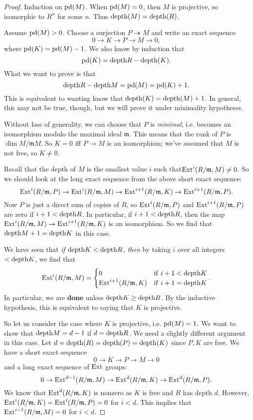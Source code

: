 \begin{proof} 
Induction on $\mathrm{pd}(M)$. When $\mathrm{pd}(M)=0$, then $M$ is projective,
so isomorphic
to $R^n$ for some $n$. Thus $\mathrm{depth}(M) = \mathrm{depth}(R)$. 

Assume $\mathrm{pd}(M) > 0$.
Choose a surjection $P \twoheadrightarrow M$ and write an exact
sequence
\[ 0 \to K \to P \to M \to 0,  \]
where $\mathrm{pd}(K) = \mathrm{pd}(M)-1$. We also know by induction that
\[ \mathrm{pd}(K) = \mathrm{depth} R - \mathrm{depth}(K).  \]
What we want to prove is that 
\[ \mathrm{depth} R - \mathrm{depth} M = \mathrm{pd}(M) = \mathrm{pd}(K)+1.  \]
This is equivalent to wanting know that $\mathrm{depth}(K) = \mathrm{depth} (M)
+1$.
In general, this may not be true, though, but we will prove it
under
minimality hypotheses.

Without loss of generality, we can choose that $P$ is
\emph{minimal}, i.e.
becomes an isomorphism modulo the maximal ideal $\mathfrak{m}$.
This means
that the rank of $P$ is $\dim M/\mathfrak{m}M$.
So $K = 0$ iff $P \to M$ is an isomorphism; we've assumed that
$M$ is not
free, so $K \neq 0$.

Recall that the depth of $M$ is the smallest value $i$ such that$\mathrm{Ext}^i(R/\mathfrak{m}, M) \neq 0$. So we should look at the
long exact
sequence from the above short exact sequence:
\[ \mathrm{Ext}^i(R/\mathfrak{m}, P) \to  \mathrm{Ext}^i(R/\mathfrak{m},M)  \to
\mathrm{Ext}^{i+1}(R/\mathfrak{m}, K) \to \mathrm{Ext}^{i+1}(R/\mathfrak{m},
P).\]
Now $P$ is just a direct sum of copies of $R$, so
$\mathrm{Ext}^i(R/\mathfrak{m}, P)$
and $\mathrm{Ext}^{i+1}(R/\mathfrak{m}, P)$ are zero if $i+1< \mathrm{depth} R$.
In
particular, if $i+1< \mathrm{depth} R$, then the map $
\mathrm{Ext}^i(R/\mathfrak{m},M) \to
\mathrm{Ext}^{i+1}(R/\mathfrak{m}, K) $ is an isomorphism.
So we find that $\mathrm{depth} M + 1 = \mathrm{depth} K$ in this case.

We have seen that \emph{if $\mathrm{depth} K < \mathrm{depth} R$, then } by
taking $i$ over
all integers $< \mathrm{depth} K$, we find that
\[ \mathrm{Ext}^{i}(R/\mathfrak{m}, M) = \begin{cases} 
0 & \mathrm{if \ } i+1 < \mathrm{depth} K \\
\mathrm{Ext}^{i+1}(R/\mathfrak{m},K) & \mathrm{if \ } i+1 = \mathrm{depth} K
\end{cases}. \]
In particular, we are \textbf{done} unless $\mathrm{depth} K \geq \mathrm{depth}
R$.
By the inductive hypothesis, this is equivalent to saying that
$K$ is
projective. 

So let us consider the case where $K$ is projective, i.e.
$\mathrm{pd}(M)=1$.
We want to show that $\mathrm{depth} M = d-1$ if $d = \mathrm{depth} R$.
We need a
slightly different argument in this case. Let $d = \mathrm{depth}(R) =
\mathrm{depth} (P) =
\mathrm{depth}(K)$ since $P,K$ are free. We have a short exact sequence
\[ 0 \to K \to P \to M \to 0  \]
and a long exact sequence of $\mathrm{Ext}$ groups:
\[ 0 \to \mathrm{Ext}^{d-1}(R/\mathfrak{m}, M) \to
\mathrm{Ext}^d(R/\mathfrak{m}, K) \to \mathrm{Ext}^d(R/\mathfrak{m}, P) .\]
We know that $\mathrm{Ext}^d(R/\mathfrak{m}, K)$ is nonzero as $K$ is
free and $R$ has
depth $d$. However, $\mathrm{Ext}^i(R/\mathfrak{m}, K) =
\mathrm{Ext}^i(R/\mathfrak{m}, P)=0$
for $i<d$. This implies that $\mathrm{Ext}^{i-1}(R/\mathfrak{m}, M)=0$
for $i<d$.


\end{proof}
